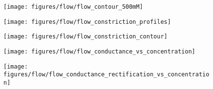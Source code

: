 \documentclass[journal=ancac3,manuscript=article,etalmode=truncate,maxauthors=0,layout=onecolumn]{achemso}
\begin{document}
\begin{figure*}[!tbp]
  \centering
  \hspace{-2cm}
  \begin{minipage}[t]{5.5cm}
    \begin{subfigure}[t]{5.5cm}
      \centering
      \caption{}\vspace{-3mm}\label{fig:flow_contour}
      \texttt{[image: figures/flow/flow\_contour\_500mM]}
    \end{subfigure}
    \begin{subfigure}[t]{5.5cm}
      \addtocounter{subfigure}{1}
      \vspace{3mm}
      \centering
      \caption{}\vspace{-3mm}\label{fig:flow_constriction_profiles}
      \texttt{[image: figures/flow/flow\_constriction\_profiles]}
    \end{subfigure}
  \end{minipage}
  \begin{subfigure}[t]{4cm}
    \addtocounter{subfigure}{-2}
    \centering
    \caption{}\vspace{2mm}\label{fig:flow_constriction_contour}
    \texttt{[image: figures/flow/flow\_constriction\_contour]}
  \end{subfigure}
  \begin{minipage}[t]{4cm}
    \begin{subfigure}[t]{4cm}
      \addtocounter{subfigure}{1}
      \centering
      \caption{}\vspace{-5mm}\label{fig:flow_conductance_vs_concentration}
      \texttt{[image: figures/flow/flow\_conductance\_vs\_concentration]}
    \end{subfigure}
    \begin{subfigure}[t]{4cm}
      \vspace{2mm}
      \centering
      \caption{}\vspace{-5mm}\label{fig:flow_conductance_rectification_vs_concentration}
      \texttt{[image: figures/flow/flow\_conductance\_rectification\_vs\_concentration]}
    \end{subfigure}
  \end{minipage}
\centering


\end{figure*}
\end{document}
